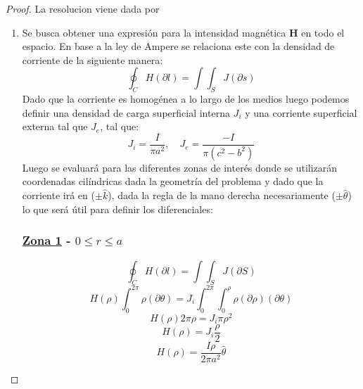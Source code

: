 \begin{proof} %
    La resolucion viene dada por
    \begin{enumerate}
        \item Se busca obtener una expresión para la intensidad magnética \textbf{H} en todo el espacio. En base a la ley de Ampere se relaciona este con la densidad de corriente de la siguiente manera:
        \begin{equation}
            \oint_{C} H (\partial l) = \int\int_{S} J (\partial s) 
        \end{equation}
        Dado que la corriente es homogénea a lo largo de los medios luego podemos definir una densidad de carga superficial interna $J_{i}$ y una corriente superficial externa tal que $J_{e}$, tal que:
        \begin{equation}
            J_{i} = \frac{I}{\pi a^{2}}, \quad J_{e} = \frac{-I}{\pi (c^{2}-b^{2})}
        \end{equation}
        Luego se evaluará para las diferentes zonas de interés donde se utilizarán coordenadas cilíndricas dada la geometría del problema y dado que la corriente irá en ($\pm\hat{k}$), dada la regla de la mano derecha necesariamente ($\pm\hat{\theta}$) lo que será útil para definir los diferenciales:
        
        \subsubsection*{\underline{Zona 1} - \(0 \leq r \leq a\)}
        \begin{equation}
            \oint_C H (\partial l) = \int\int_{S} J (\partial S)
        \end{equation}
        \begin{equation}
            H(\rho)\int_{0}^{2\pi} \rho (\partial \theta) = J_{i} \int_{0}^{2\pi} \int_{0}^{\rho} \rho (\partial \rho )(\partial \theta )
        \end{equation}
        \begin{equation}
            H(\rho) 2\pi \rho = J_{i} \pi \rho^{2}
        \end{equation}
        \begin{equation}
            H(\rho) = J_{i} \frac{\rho}{2}
        \end{equation}
        \begin{equation}
            H(\rho) = \frac{I\rho}{2\pi a^{2}} \hat{\theta}
        \end{equation}
        

\end{enumerate}
\end{proof}
